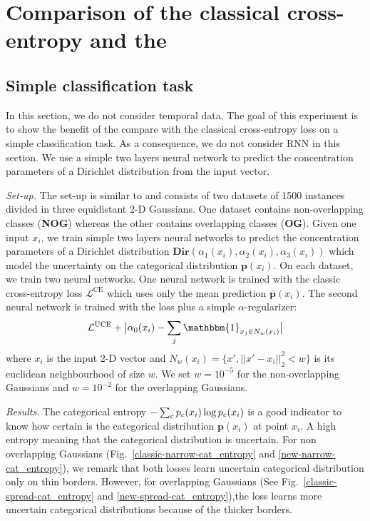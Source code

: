 \section{Comparison of the classical cross-entropy and the \UncertaintyLoss}
\label{uncertain_loss_classification}

\subsection{Simple classification task}

In this section, we do not consider temporal data. The goal of this experiment is to show the benefit of the \UncertaintyLoss compare with the classical cross-entropy loss on a simple classification task. As a consequence, we do not consider RNN in this section. We use a simple two layers neural network to predict the concentration parameters of a Dirichlet distribution from the input vector.

\textit{Set-up.} The set-up is similar to \cite{PriorNetworks} and consists of two datasets of 1500 instances divided in three equidistant 2-D Gaussians. One dataset contains non-overlapping classes (\textbf{NOG}) whereas the other contains overlapping classes (\textbf{OG}). Given one input $x_i$, we train simple two layers neural networks to predict the concentration parameters of a Dirichlet distribution $\textbf{Dir}(\alpha_1(x_i), \alpha_2(x_i), \alpha_3(x_i))$ which model the uncertainty on the categorical distribution $\bm{p}(x_i)$. On each dataset, we train two neural networks. One neural network is trained with the classic cross-entropy loss $\mathcal{L}^{\text{CE}}$ which uses only the mean prediction $\bar{\bm{p}}(x_i)$. The second neural network is trained with the \UncertaintyLoss loss plus a simple $\alpha$-regularizer:
\begin{equation}
\begin{aligned}
\mathcal{L}^{\text{UCE}} + \bigl\lvert\alpha_0(x_i) - \sum_j  \mathbbm{1}_{x_j \in N_w(x_i) }\bigr\rvert
\end{aligned}
\end{equation}
where $x_i$ is the input 2-D vector and $N_w(x_i) = \{x', ||x' - x_i||_2^2 < w\}$ is its euclidean neighbourhood of size $w$. We set $w=10^{-5}$ for the non-overlapping Gaussians and $w=10^{-2}$ for the overlapping Gaussians.

\textit{Results.} The categorical entropy $-\sum_c p_c(x_i) \log p_c(x_i)$ is a good indicator to know how certain is the categorical distribution $\bm{p}(x_i)$ at point $x_i$. A high entropy meaning that the categorical distribution is uncertain. For non overlapping Gaussians (Fig.\ \ref{classic-narrow-cat_entropy} and \ref{new-narrow-cat_entropy}), we remark that both losses learn uncertain categorical distribution only on thin borders. However, for overlapping Gaussians (See Fig.\ \ref{classic-spread-cat_entropy} and \ref{new-spread-cat_entropy}),the \UncertaintyLoss loss learns more uncertain categorical distributions because of the thicker borders.

